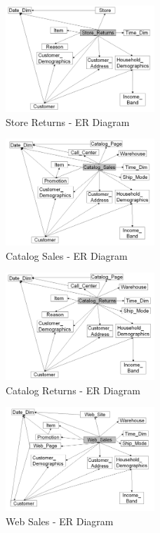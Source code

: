 \documentclass[conference]{IEEEtran}
\begin{document}
\begin{figure}[h]
	\centering
	\includegraphics[width=0.5\textwidth]{images/ER_Diagrams/Store Returns - ER Diagram.png}
	\caption{Store Returns - ER Diagram}
	\label{fig:store_returns_er_diagram}
\end{figure}

\begin{figure}[h]
	\centering
	\includegraphics[width=0.5\textwidth]{images/ER_Diagrams/Catalog Sales - ER Diagram.png}
	\caption{Catalog Sales - ER Diagram}
	\label{fig:catalog_sales_er_diagram}
\end{figure}

\begin{figure}[h]
	\centering
	\includegraphics[width=0.5\textwidth]{images/ER_Diagrams/Catalog Returns - ER Diagram.png}
	\caption{Catalog Returns - ER Diagram}
	\label{fig:catalog_returns_er_diagram}
\end{figure}


\begin{figure}[h]
	\centering
	\includegraphics[width=0.5\textwidth]{images/ER_Diagrams/Web Sales - ER Diagram.png}
	\caption{Web Sales - ER Diagram}
	\label{fig:web_sales_er_diagram}
\end{figure}
\end{document}
